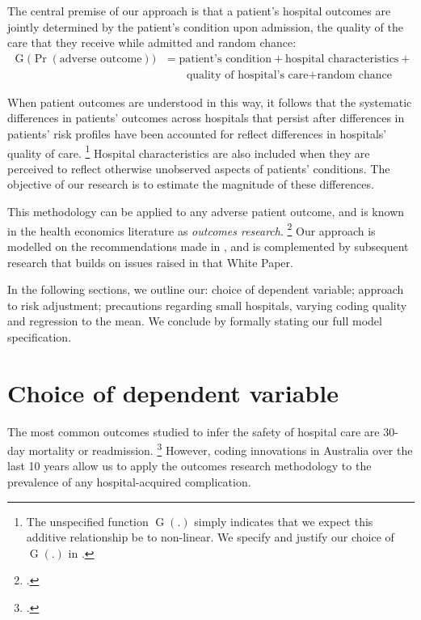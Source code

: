 \documentclass[submission]{grattan}
\begin{document}
The central premise of our approach is that a patient's hospital outcomes are jointly determined by the patient's condition upon admission, the quality of the care that they receive while admitted and random chance:
\begin{align*}
\operatorname{G}(\Pr{\left( \text{adverse\ outcome} \right))} & = \text{patient's condition} + \text{hospital characteristics} + {}\\
                                                              & \qquad\text{quality of hospital's care} + \text{random chance}
\end{align*}

When patient outcomes are understood in this way, it follows that the systematic differences in patients' outcomes across hospitals that persist after differences in patients' risk profiles have been accounted for reflect differences in hospitals' quality of care.%
\footnote{The unspecified function \(\operatorname{G}(.)\) simply indicates that we expect this additive relationship be to non-linear.
We specify and justify our choice of \(\operatorname{G}(.)\) in .}
Hospital characteristics are also included when they are perceived to reflect otherwise unobserved aspects of patients' conditions.
The objective of our research is to estimate the magnitude of these differences.

This methodology can be applied to any adverse patient outcome, and is known in the health economics literature as \emph{outcomes research}.%
	\footcite{Alemayehu-2017-Stat-topics-in-health-economics}
Our approach is modelled on the recommendations made in \textcite{Ash-etal-2012-Stats-issues-assessing-hospital-perf}, and is complemented by subsequent research that builds on issues raised in that White Paper.

In the following sections, we outline our: choice of dependent variable; approach to risk adjustment; precautions regarding small hospitals, varying coding quality and regression to the mean.
We conclude by formally stating our full model specification.

\section{Choice of dependent variable}\label{sec:choice-of-dependent-variable}

The most common outcomes studied to infer the safety of hospital care are 30-day mortality or readmission.%
	\footcite{Ash-etal-2012-Stats-issues-assessing-hospital-perf}
However, coding innovations in Australia over the last 10 years allow us to apply the outcomes research methodology to the prevalence of any hospital-acquired complication.
\end{document}
